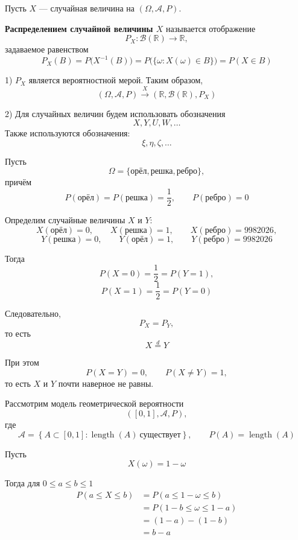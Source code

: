 \documentclass[12pt,a4paper]{article}
\begin{document}
Пусть $X$ --- случайная величина на $(\Omega,\mathcal{A},P)$.

\begin{definition}

\textbf{Распределением случайной величины $X$} называется отображение
\[
P_X:\mathcal{B}(\mathbb{R})\to\mathbb{R},
\]
задаваемое равенством
\[
P_X(B)=P\bigl(X^{-1}(B)\bigr)
=P\bigl(\{\omega:X(\omega)\in B\}\bigr)
=P(X\in B)
\]

\end{definition}

\begin{note}

1) $P_X$ является вероятностной мерой. Таким образом,
\[
(\Omega,\mathcal{A},P)
\xrightarrow{\,X\,}
(\mathbb{R},\mathcal{B}(\mathbb{R}),P_X)
\]

2) Для случайных величин будем использовать обозначения
\[
X,Y,U,W,\ldots
\]
Также используются обозначения:
\[
\xi,\eta,\zeta,\ldots
\]

\end{note}

\begin{example}

Пусть
\[
\Omega=\{\text{орёл},\text{решка},\text{ребро}\},
\]
причём
\[
P(\text{орёл})=P(\text{решка})=\frac12,
\qquad
P(\text{ребро})=0
\]

Определим случайные величины $X$ и $Y$:
\[
X(\text{орёл})=0,\qquad
X(\text{решка})=1,\qquad
X(\text{ребро})=9982026,
\]
\[
Y(\text{решка})=0,\qquad
Y(\text{орёл})=1,\qquad
Y(\text{ребро})=9982026
\]

Тогда
\[
P(X=0)=\frac12=P(Y=1),
\]
\[
P(X=1)=\frac12=P(Y=0)
\]

Следовательно,
\[
P_X=P_Y,
\]
то есть
\[
X\overset{d}{=}Y
\]

При этом
\[
P(X=Y)=0,
\qquad
P(X\neq Y)=1,
\]
то есть $X$ и $Y$ почти наверное не равны.

\medskip

Рассмотрим модель геометрической вероятности
\[
([0,1],\mathcal{A},P),
\]
где
\[
\mathcal{A}
=
\left\{
A\subset[0,1]:
\operatorname{length}(A)\ \text{существует}
\right\},
\qquad
P(A)=\operatorname{length}(A)
\]

Пусть
\[
X(\omega)=1-\omega
\]

Тогда для $0\leq a\leq b\leq1$
\[
\begin{aligned}
P(a\leq X\leq b)
&=P(a\leq1-\omega\leq b)\\
&=P(1-b\leq\omega\leq1-a)\\
&=(1-a)-(1-b)\\
&=b-a
\end{aligned}
\]

\end{example}
\end{document}
